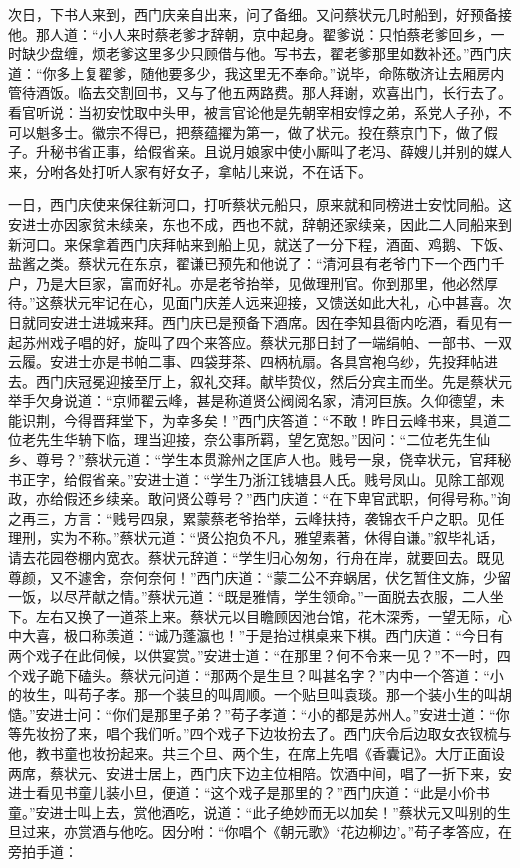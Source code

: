 次日，下书人来到，西门庆亲自出来，问了备细。又问蔡状元几时船到，好预备接他。那人道：“小人来时蔡老爹才辞朝，京中起身。翟爹说：只怕蔡老爹回乡，一时缺少盘缠，烦老爹这里多少只顾借与他。写书去，翟老爹那里如数补还。”西门庆道：“你多上复翟爹，随他要多少，我这里无不奉命。”说毕，命陈敬济让去厢房内管待酒饭。临去交割回书，又与了他五两路费。那人拜谢，欢喜出门，长行去了。看官听说：当初安忱取中头甲，被言官论他是先朝宰相安惇之弟，系党人子孙，不可以魁多士。徽宗不得已，把蔡蕴擢为第一，做了状元。投在蔡京门下，做了假子。升秘书省正事，给假省亲。且说月娘家中使小厮叫了老冯、薛嫂儿并别的媒人来，分咐各处打听人家有好女子，拿帖儿来说，不在话下。

一日，西门庆使来保往新河口，打听蔡状元船只，原来就和同榜进士安忱同船。这安进士亦因家贫未续亲，东也不成，西也不就，辞朝还家续亲，因此二人同船来到新河口。来保拿着西门庆拜帖来到船上见，就送了一分下程，酒面、鸡鹅、下饭、盐酱之类。蔡状元在东京，翟谦已预先和他说了：“清河县有老爷门下一个西门千户，乃是大巨家，富而好礼。亦是老爷抬举，见做理刑官。你到那里，他必然厚待。”这蔡状元牢记在心，见面门庆差人远来迎接，又馈送如此大礼，心中甚喜。次日就同安进士进城来拜。西门庆已是预备下酒席。因在李知县衙内吃酒，看见有一起苏州戏子唱的好，旋叫了四个来答应。蔡状元那日封了一端绢帕、一部书、一双云履。安进士亦是书帕二事、四袋芽茶、四柄杭扇。各具宫袍乌纱，先投拜帖进去。西门庆冠冕迎接至厅上，叙礼交拜。献毕贽仪，然后分宾主而坐。先是蔡状元举手欠身说道：“京师翟云峰，甚是称道贤公阀阅名家，清河巨族。久仰德望，未能识荆，今得晋拜堂下，为幸多矣！”西门庆答道：“不敢！昨日云峰书来，具道二位老先生华辀下临，理当迎接，奈公事所羁，望乞宽恕。”因问：“二位老先生仙乡、尊号？”蔡状元道：“学生本贯滁州之匡庐人也。贱号一泉，侥幸状元，官拜秘书正字，给假省亲。”安进士道：“学生乃浙江钱塘县人氏。贱号凤山。见除工部观政，亦给假还乡续亲。敢问贤公尊号？”西门庆道：“在下卑官武职，何得号称。”询之再三，方言：“贱号四泉，累蒙蔡老爷抬举，云峰扶持，袭锦衣千户之职。见任理刑，实为不称。”蔡状元道：“贤公抱负不凡，雅望素著，休得自谦。”叙毕礼话，请去花园卷棚内宽衣。蔡状元辞道：“学生归心匆匆，行舟在岸，就要回去。既见尊颜，又不遽舍，奈何奈何！”西门庆道：“蒙二公不弃蜗居，伏乞暂住文旆，少留一饭，以尽芹献之情。”蔡状元道：“既是雅情，学生领命。”一面脱去衣服，二人坐下。左右又换了一道茶上来。蔡状元以目瞻顾因池台馆，花木深秀，一望无际，心中大喜，极口称羡道：“诚乃蓬瀛也！”于是抬过棋桌来下棋。西门庆道：“今日有两个戏子在此伺候，以供宴赏。”安进士道：“在那里？何不令来一见？”不一时，四个戏子跪下磕头。蔡状元问道：“那两个是生旦？叫甚名字？”内中一个答道：“小的妆生，叫苟子孝。那一个装旦的叫周顺。一个贴旦叫袁琰。那一个装小生的叫胡慥。”安进士问：“你们是那里子弟？”苟子孝道：“小的都是苏州人。”安进士道：“你等先妆扮了来，唱个我们听。”四个戏子下边妆扮去了。西门庆令后边取女衣钗梳与他，教书童也妆扮起来。共三个旦、两个生，在席上先唱《香囊记》。大厅正面设两席，蔡状元、安进士居上，西门庆下边主位相陪。饮酒中间，唱了一折下来，安进士看见书童儿装小旦，便道：“这个戏子是那里的？”西门庆道：“此是小价书童。”安进士叫上去，赏他酒吃，说道：“此子绝妙而无以加矣！”蔡状元又叫别的生旦过来，亦赏酒与他吃。因分咐：“你唱个《朝元歌》‘花边柳边’。”苟子孝答应，在旁拍手道：


